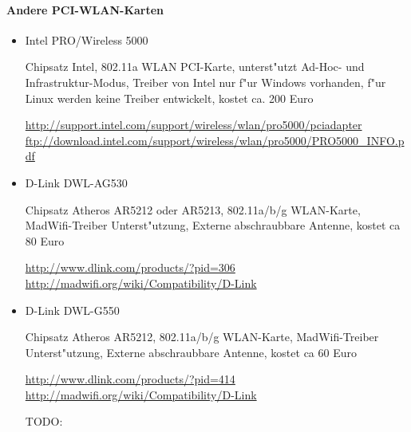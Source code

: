\paragraph{Andere PCI-WLAN-Karten}

\begin{itemize}

\item Intel PRO/Wireless 5000

Chipsatz Intel,
802.11a WLAN PCI-Karte, unterst"utzt Ad-Hoc- und Infrastruktur-Modus,
Treiber von Intel nur f"ur Windows vorhanden, f"ur Linux werden keine
Treiber entwickelt, kostet ca. 200 Euro

\url{http://support.intel.com/support/wireless/wlan/pro5000/pciadapter}\\
\url{ftp://download.intel.com/support/wireless/wlan/pro5000/PRO5000_INFO.pdf}

\item D-Link DWL-AG530

Chipsatz Atheros AR5212 oder AR5213,
802.11a/b/g WLAN-Karte,
MadWifi-Treiber Unterst"utzung,
Externe abschraubbare Antenne, kostet ca 80 Euro

\url{http://www.dlink.com/products/?pid=306}\\
\url{http://madwifi.org/wiki/Compatibility/D-Link}

\item D-Link DWL-G550

Chipsatz Atheros AR5212,
802.11a/b/g WLAN-Karte,
MadWifi-Treiber Unterst"utzung,
Externe abschraubbare Antenne, kostet ca 60 Euro

\url{http://www.dlink.com/products/?pid=414}\\
\url{http://madwifi.org/wiki/Compatibility/D-Link}

TODO: 

\end{itemize}
